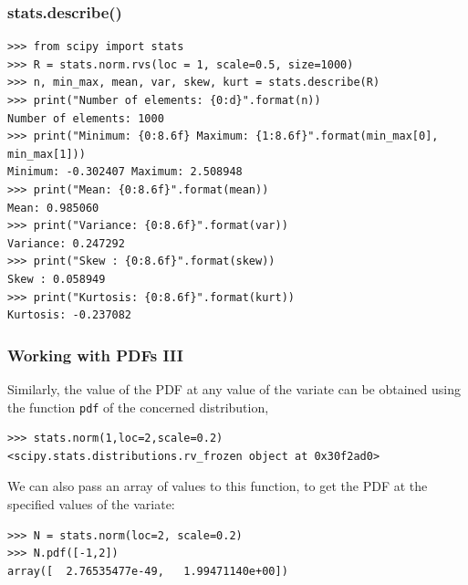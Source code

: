 \documentclass[10pt,colorlinks]{beamer}
\begin{document}
\begin{frame}[fragile]\frametitle{stats.describe()}
{ \small
\begin{verbatim}
>>> from scipy import stats
>>> R = stats.norm.rvs(loc = 1, scale=0.5, size=1000)
>>> n, min_max, mean, var, skew, kurt = stats.describe(R)
>>> print("Number of elements: {0:d}".format(n))
Number of elements: 1000
>>> print("Minimum: {0:8.6f} Maximum: {1:8.6f}".format(min_max[0], min_max[1]))
Minimum: -0.302407 Maximum: 2.508948
>>> print("Mean: {0:8.6f}".format(mean))
Mean: 0.985060
>>> print("Variance: {0:8.6f}".format(var))
Variance: 0.247292
>>> print("Skew : {0:8.6f}".format(skew))
Skew : 0.058949
>>> print("Kurtosis: {0:8.6f}".format(kurt))
Kurtosis: -0.237082
\end{verbatim}

}
\end{frame}


\begin{frame}[fragile]\frametitle{Working with PDFs III}
Similarly, the value of the PDF at any value of the variate can be obtained using the function \verb|pdf| of the concerned distribution,
\begin{verbatim}
>>> stats.norm(1,loc=2,scale=0.2)
<scipy.stats.distributions.rv_frozen object at 0x30f2ad0>
\end{verbatim}

We can also pass an array of values to this function, to get the PDF at the specified values of the variate:
\begin{verbatim}
>>> N = stats.norm(loc=2, scale=0.2)
>>> N.pdf([-1,2])
array([  2.76535477e-49,   1.99471140e+00])
\end{verbatim}

\end{frame}
\end{document}
